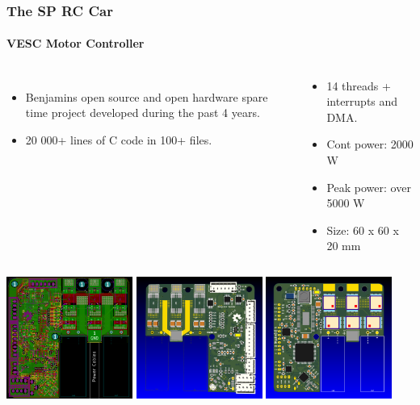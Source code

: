 \documentclass[aspectratio=169,electronics,notopline]{beamer}
\begin{document}
\begin{frame}
\frametitle{The SP RC Car}
\framesubtitle{VESC Motor Controller}
\begin{columns}
\begin{itemize}
\item Benjamins open source and open hardware spare time project developed during the past 4 years.
\item 20 000+ lines of C code in 100+ files.
\end{itemize}
\begin{center}
\begin{itemize}
\item 14 threads + interrupts and DMA.
\item Cont power: 2000 W
\item Peak power: over 5000 W
\item Size: 60 x 60 x 20 mm
\end{itemize}
\end{center}
\end{columns}
\begin{center}
\vspace{-3mm}
\includegraphics[height=40mm]{Figures/VESC_6.png} \hspace{5mm}
\includegraphics[height=40mm]{Figures/VESC_6_F.png} \hspace{5mm}
\includegraphics[height=40mm]{Figures/VESC_6_B.png}
\end{center}
\end{frame}
\end{document}
